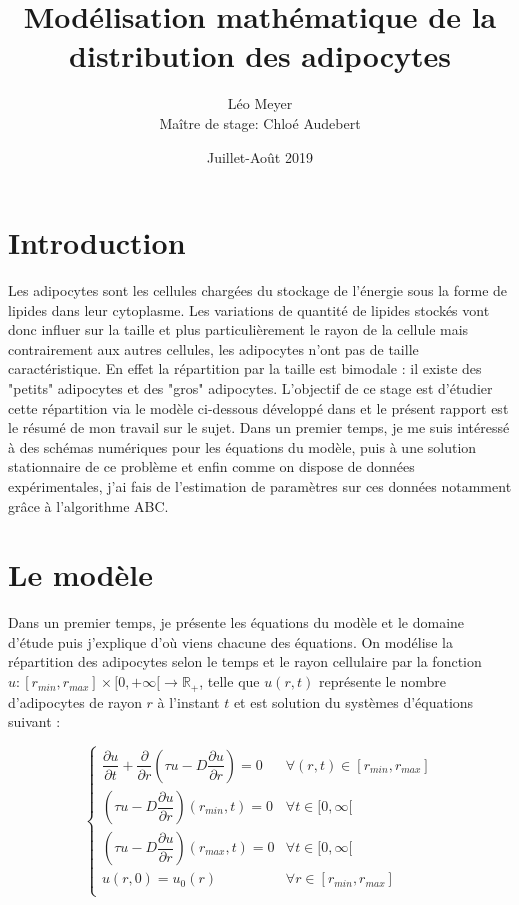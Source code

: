 \documentclass[a4paper,fleqn,leqno]{article}
\title{Modélisation mathématique de la distribution des adipocytes}
\author{Léo Meyer\\[1cm]{\small Maître de stage: Chloé Audebert}}
\date{Juillet-Août 2019}
\begin{document}
\sloppy
\maketitle
\newpage
\tableofcontents


\newpage

\section{Introduction}

Les adipocytes sont les cellules chargées du stockage de l’énergie sous la forme de lipides dans leur cytoplasme. Les variations de quantité de lipides stockés vont donc influer sur la taille et plus particulièrement le rayon de la cellule mais contrairement aux autres cellules, les adipocytes n'ont pas de taille caractéristique. En effet la répartition par la taille est bimodale : il existe des "petits" adipocytes et des "gros" adipocytes. L'objectif de  ce stage est d'étudier cette répartition via le modèle ci-dessous développé dans \cite{Soula2013} et le présent rapport est le résumé de mon travail sur le sujet.
Dans un premier temps, je me suis intéressé à des schémas numériques pour les équations du modèle, puis à une solution stationnaire de ce problème et enfin comme on dispose de données expérimentales, j'ai fais de l'estimation de paramètres sur ces données notamment grâce à l'algorithme ABC.

\newpage

\section{Le modèle}

Dans un premier temps, je présente les équations du modèle et le domaine d'étude puis j'explique d'où viens chacune des équations.
On modélise la répartition des adipocytes selon le temps et le rayon cellulaire par la fonction $u : [r_{min},r_{max}]\times[0,+\infty[ \rightarrow \mathbb{R}_+$, telle que $u(r,t)$ représente le nombre d'adipocytes de rayon $r$ à l'instant $t$ et est solution du systèmes d'équations suivant :

\begin{equation}\label{eq:EDP}
\begin{cases}
\dfrac{\partial u}{\partial t} + \dfrac{\partial}{\partial r}\left(\tau u-D\dfrac{\partial u}{\partial r}\right) = 0 & \forall(r,t)\in [r_{min},r_{max}]\\
\left(\tau u-D\dfrac{\partial u}{\partial r}\right)(r_{min},t) = 0 & \forall t\in[0,\infty[\\
\left(\tau u-D\dfrac{\partial u}{\partial r}\right)(r_{max},t) = 0 & \forall t\in[0,\infty[\\
u(r,0) = u_0(r) & \forall r\in [r_{min},r_{max}]\\
\end{cases}
\end{equation}
\end{document}
